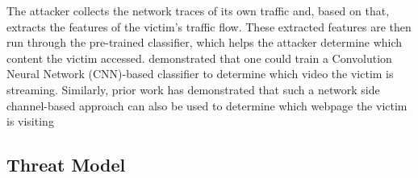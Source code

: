 The attacker collects the network traces of its own traffic and, based on that, extracts the features of the victim's traffic flow. These extracted features are then run through the pre-trained classifier, which helps the attacker determine which content the victim accessed. \citeauthor{schuster2017beautyburst} demonstrated that one could train a Convolution Neural Network (CNN)-based classifier to determine which video the victim is streaming. Similarly, prior work has demonstrated that such a network side channel-based approach can also be used to determine which webpage the victim is visiting \cite{hayes2016kfp, panchenko2016website, gong2010fingerprinting}

\subsection{Threat Model}\label{subsec:nsc-threat-model}
